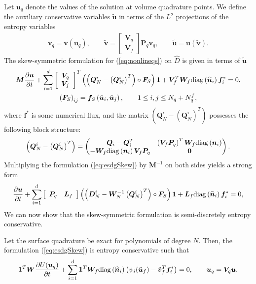 \documentclass[review]{siamart0216}
\theoremstyle{assumption}
\renewcommand{\hat}[1]{\hat{#1}}
\newcommand{\pd}[2]{\frac{\partial#1}{\partial#2}}
\newcommand{\LRp}[1]{\left( #1 \right)}
\newcommand{\LRs}[1]{\left[ #1 \right]}
\renewcommand{\hat}{\widehat}
\newcommand{\diag}[1]{{\rm diag}\LRp{#1}}
\begin{document}
Let $\bm{u}_q$ denote the values of the solution at volume quadrature points.  We define the auxiliary conservative variables $\tilde{\bm{u}}$ in terms of the $L^2$ projections of the entropy variables 
\begin{gather}
\bm{v}_q = \bm{v}\LRp{\bm{u}_q}, \qquad \tilde{\bm{v}} = \begin{bmatrix}
\bm{V}_q\\
\bm{V}_f
\end{bmatrix}\bm{P}_q\bm{v}_q, \qquad \tilde{\bm{u}} = \bm{u}\LRp{\tilde{\bm{v}}}.
\end{gather}
The skew-symmetric formulation for (\ref{eq:nonlineqs}) on $\hat{D}$ is given in terms of $\tilde{\bm{u}}$
\begin{gather}
\bm{M}\pd{\bm{u}}{t} + \sum_{i=1}^d\LRs{\begin{array}{c}
\bm{V}_q \\ \bm{V}_f\end{array}}^T 
\LRp{\LRp{\bm{Q}^i_N - \LRp{\bm{Q}^i_N}^T} \circ \bm{F}_S}\bm{1} + \bm{V}_f^T\bm{W}_f \diag{\hat{\bm{n}}_i}\bm{f}_i^* = 0,  \label{eq:esdgSkew}\\
\LRp{\bm{F}_S}_{ij} = \bm{f}_S\LRp{\tilde{\bm{u}}_i,\tilde{\bm{u}}_j}, \qquad 1\leq i,j\leq N_q + N^f_q,\nonumber
\end{gather}
where $\bm{f}^*$ is some numerical flux, and the matrix $\LRp{\bm{Q}^i_N - \LRp{\bm{Q}^i_N}^T}$ possesses the following block structure:
\[
\LRp{\bm{Q}^i_N - \LRp{\bm{Q}^i_N}^T} = \begin{pmatrix}
\bm{Q}_i-\bm{Q}_i^T & \LRp{\bm{V}_f \bm{P}_q}^T\bm{W}_f\diag{\bm{n}_i}\\
-\bm{W}_f\diag{\bm{n}_i}{\bm{V}_f \bm{P}_q} & \bm{0}
\end{pmatrix}.
\]
Multiplying the formulation (\ref{eq:esdgSkew}) by $\bm{M}^{-1}$ on both sides yields a strong form 
\begin{gather*}
\pd{\bm{u}}{t} + \sum_{i=1}^d \LRs{\begin{array}{cc}
\bm{P}_q & \bm{L}_f\end{array}} \LRp{\LRp{\bm{D}^i_N - \bm{W}_N^{-1}\LRp{\bm{Q}^i_N}^T} \circ \bm{F}_S}\bm{1} + \bm{L}_f \diag{\hat{\bm{n}}_i}\bm{f}_i^* = 0,
\end{gather*}
We can now show that the skew-symmetric formulation is semi-discretely entropy conservative.  
\begin{theorem}
Let the surface quadrature be exact for polynomials of degree $N$.  Then, the formulation (\ref{eq:esdgSkew}) is entropy conservative such that
\[
\bm{1}^T\bm{W}\pd{U(\bm{u}_q)}{t} + \sum_{i=1}^d\bm{1}^T\bm{W}_f \diag{\hat{\bm{n}}_i} \LRp{\psi_i(\tilde{\bm{u}}_f) - \tilde{\bm{v}}_f^T\bm{f}_i^*} = 0, \qquad \bm{u}_q = \bm{V}_q\bm{u}.
\]
\label{thm:esdg}
\end{theorem}
\end{document}
